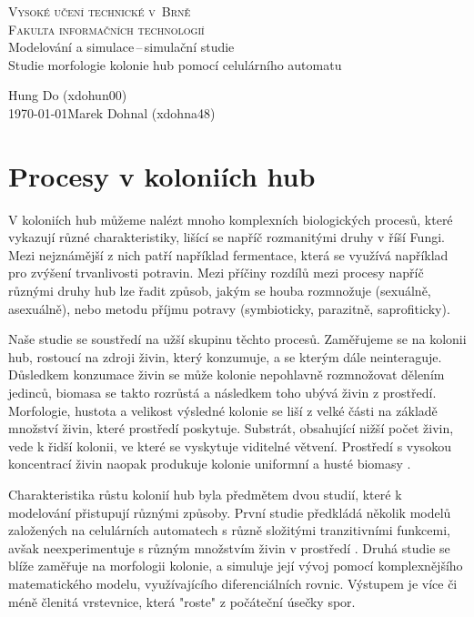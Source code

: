 \documentclass{article}
\begin{document}
\begin{titlepage}
    \begin{center}
        \huge \textsc{Vysoké učení technické v~Brně\\
        \huge Fakulta informačních technologií}\\
        \LARGE Modelování a simulace\,--\,simulační studie\\
        \Huge Studie morfologie kolonie hub pomocí celulárního automatu\\
    \end{center}
    \Large \hfill Hung Do (xdohun00) \\
    {\Large \today \hfill Marek Dohnal (xdohna48)}
\end{titlepage}

\tableofcontents
\newpage

\section{Procesy v koloniích hub}
V koloniích hub můžeme nalézt mnoho komplexních biologických procesů, které vykazují různé charakteristiky, lišící se napříč rozmanitými druhy v říší Fungi. Mezi nejznámější z nich patří například fermentace, která se využívá například pro zvýšení trvanlivosti potravin. Mezi příčiny rozdílů mezi procesy napříč různými druhy hub lze řadit způsob, jakým se houba rozmnožuje (sexuálně, asexuálně), nebo metodu příjmu potravy (symbioticky, parazitně, saprofiticky). 

Naše studie se soustředí na užší skupinu těchto procesů. Zaměřujeme se na kolonii hub, rostoucí na zdroji živin, který konzumuje, a se kterým dále neinteraguje. Důsledkem konzumace živin se může kolonie nepohlavně rozmnožovat dělením jedinců, biomasa se takto rozrůstá a následkem toho ubývá živin z prostředí. Morfologie, hustota a velikost výsledné kolonie se liší z velké části na základě množství živin, které prostředí poskytuje. Substrát, obsahující nižší počet živin, vede k řidší kolonii, ve které se vyskytuje viditelné větvení. Prostředí s vysokou koncentrací živin naopak produkuje kolonie uniformní a husté biomasy \cite{solidSubstrates} \cite{morphological}. 

Charakteristika růstu kolonií hub byla předmětem dvou studií, které k modelování přistupují různými způsoby. První studie předkládá několik modelů založených na celulárních automatech s různě složitými tranzitivními funkcemi, avšak neexperimentuje s různým množstvím živin v prostředí \cite{solidSubstrates}. 
Druhá studie se blíže zaměřuje na morfologii kolonie, a simuluje její vývoj pomocí komplexnějšího matematického modelu, využívajícího diferenciálních rovnic. Výstupem je více či méně členitá vrstevnice, která "roste" z počáteční úsečky spor. \cite{morphological}
\end{document}
